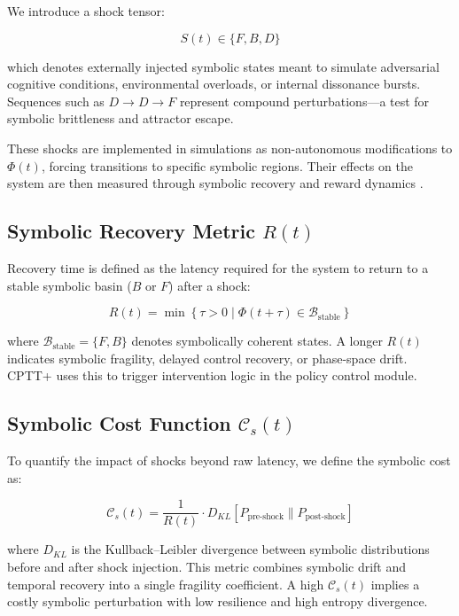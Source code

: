 \documentclass[12pt]{article}
\begin{document}
We introduce a shock tensor:

\begin{equation}
S(t) \in \{F, B, D\}
\end{equation}

\noindent which denotes externally injected symbolic states meant to simulate adversarial cognitive conditions, environmental overloads, or internal dissonance bursts. Sequences such as $D \rightarrow D \rightarrow F$ represent compound perturbations—a test for symbolic brittleness and attractor escape.

These shocks are implemented in simulations as non-autonomous modifications to $\Phi(t)$, forcing transitions to specific symbolic regions. Their effects on the system are then measured through symbolic recovery and reward dynamics \cite{amodei2016concrete, chollet2019measure}.

\subsection{Symbolic Recovery Metric $R(t)$}

Recovery time is defined as the latency required for the system to return to a stable symbolic basin ($B$ or $F$) after a shock:

\begin{equation}
R(t) = \min \left\{ \tau > 0 \mid \Phi(t + \tau) \in \mathcal{B}_{\text{stable}} \right\}
\end{equation}

\noindent where $\mathcal{B}_{\text{stable}} = \{F, B\}$ denotes symbolically coherent states. A longer $R(t)$ indicates symbolic fragility, delayed control recovery, or phase-space drift. CPTT+ uses this to trigger intervention logic in the policy control module.

\subsection{Symbolic Cost Function $\mathcal{C}_s(t)$}

To quantify the impact of shocks beyond raw latency, we define the symbolic cost as:

\begin{equation}
\mathcal{C}_s(t) = \frac{1}{R(t)} \cdot D_{KL}[P_{\text{pre-shock}} \| P_{\text{post-shock}}]
\end{equation}

\noindent where $D_{KL}$ is the Kullback–Leibler divergence between symbolic distributions before and after shock injection. This metric combines symbolic drift and temporal recovery into a single fragility coefficient. A high $\mathcal{C}_s(t)$ implies a costly symbolic perturbation with low resilience and high entropy divergence.
\end{document}
